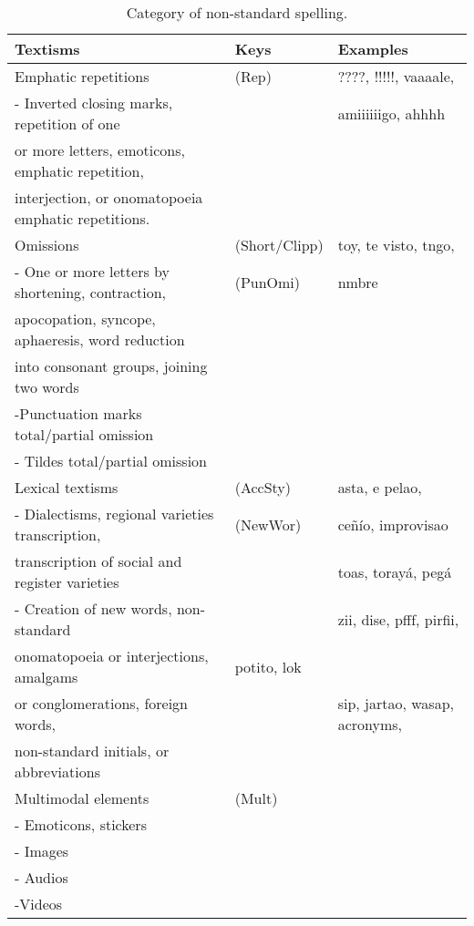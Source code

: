 \documentclass[english]{textolivre}
\begin{document}
\begin{table}[htpb]
\caption{Category of non-standard spelling.}
\label{tbl-tabela-01}
\small
\centering
\begin{tabular}{llp{4.3cm}}
\toprule 
Textisms                      & Keys                       & Examples\\ 
\midrule
Emphatic repetitions                 & (Rep)                & ????, !!!!!, vaaaale, \\
- Inverted closing marks, repetition of one & & amiiiiiigo, ahhhh\\
or more letters, emoticons, emphatic repetition, \\
interjection, or onomatopoeia emphatic repetitions.\\
Omissions & (Short/Clipp) & toy, te visto, tngo, \\
- One or more letters by shortening, contraction, & (PunOmi) & nmbre\\
apocopation, syncope, aphaeresis, word reduction \\
into consonant groups, joining two words\\
 -Punctuation marks total/partial omission \\
 - Tildes total/partial omission\\
 Lexical textisms & (AccSty) & asta, e pelao,\\
 - Dialectisms, regional varieties transcription, & (NewWor) & ceñío, improvisao\\
 transcription of social and register varieties & & toas, torayá, pegá\\
 - Creation of new words, non-standard  & & zii, dise, pfff, pirfii,\\
 onomatopoeia or interjections, amalgams  & potito, lok \\
 or conglomerations, foreign words, & & sip, jartao, wasap, acronyms,\\
 non-standard initials, or abbreviations & \\
 Multimodal elements & (Mult)\\
 - Emoticons, stickers\\
 - Images\\
 - Audios\\
 -Videos\\
\bottomrule
\end{tabular}
\end{table}
\end{document}
